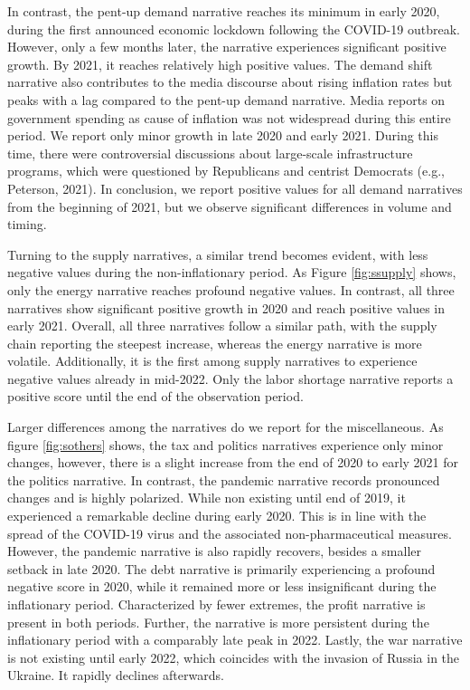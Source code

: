 In contrast, the pent-up demand narrative reaches its minimum in early 2020, during the first announced economic lockdown following the COVID-19 outbreak. However, only a few months later, the narrative experiences significant positive growth. By 2021, it reaches relatively high positive values. The demand shift narrative also contributes to the media discourse about rising inflation rates but peaks with a lag compared to the pent-up demand narrative. Media reports on government spending as cause of inflation was not widespread during this entire period. We report only minor growth in late 2020 and early 2021. During this time, there were controversial discussions about large-scale infrastructure programs, which were questioned by Republicans and centrist Democrats (e.g., Peterson, 2021). In conclusion, we report positive values for all demand narratives from the beginning of 2021, but we observe significant differences in volume and timing.

Turning to the supply narratives, a similar trend becomes evident, with less negative values during the non-inflationary period. As Figure \ref{fig:ssupply} shows, only the energy narrative reaches profound negative values. In contrast, all three narratives show significant positive growth in 2020 and reach positive values in early 2021. Overall, all three narratives follow a similar path, with the supply chain reporting the steepest increase, whereas the energy narrative is more volatile. Additionally, it is the first among supply narratives to experience negative values already in mid-2022. Only the labor shortage narrative reports a positive score until the end of the observation period.

Larger differences among the narratives do we report for the miscellaneous. As figure \ref{fig:sothers} shows, the tax and politics narratives experience only minor changes, however, there is a slight increase from the end of 2020 to early 2021 for the politics narrative. In contrast, the pandemic narrative records pronounced changes and is highly polarized. While non existing until end of 2019, it experienced a remarkable decline during early 2020. This is in line with the spread of the COVID-19 virus and the associated non-pharmaceutical measures. However, the pandemic narrative is also rapidly recovers, besides a smaller setback in late 2020. The debt narrative is primarily experiencing a profound negative score in 2020, while it remained more or less insignificant during the inflationary period. Characterized by fewer extremes, the profit narrative is present in both periods. Further, the narrative is more persistent during the inflationary period with a comparably late peak in 2022. Lastly, the war narrative is not existing until early 2022, which coincides with the invasion of Russia in the Ukraine. It rapidly declines afterwards.


